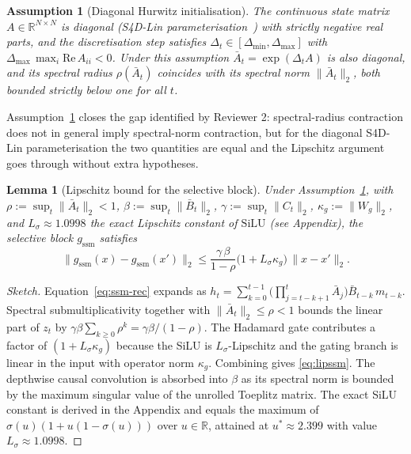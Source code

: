\documentclass{ieeeaccess}
\newcommand{\R}{\mathbb{R}}
\newtheorem{lemma}[theorem]{Lemma}
\newtheorem{assumption}[theorem]{Assumption}
\begin{document}
\begin{assumption}[Diagonal Hurwitz initialisation]
\label{ass:hurwitz}
The continuous state matrix $A\in\R^{N\times N}$ is diagonal (S4D-Lin parameterisation~\cite{Gu2022S4D}) with strictly negative real parts, and the discretisation step satisfies $\Delta_{t}\in[\Delta_{\min},\Delta_{\max}]$ with $\Delta_{\max}\,\max_{i}\mathrm{Re}\,A_{ii}<0$. Under this assumption $\bar A_{t}=\exp(\Delta_{t}A)$ is also diagonal, and its spectral radius $\rho(\bar A_{t})$ coincides with its spectral norm $\|\bar A_{t}\|_{2}$, both bounded strictly below one for all $t$.
\end{assumption}

Assumption~\ref{ass:hurwitz} closes the gap identified by Reviewer 2: spectral-radius contraction does not in general imply spectral-norm contraction, but for the diagonal S4D-Lin parameterisation the two quantities are equal and the Lipschitz argument goes through without extra hypotheses.

\begin{lemma}[Lipschitz bound for the selective block]
\label{lem:lipssm}
Under Assumption~\ref{ass:hurwitz}, with $\rho:=\sup_{t}\|\bar A_{t}\|_{2}<1$, $\beta:=\sup_{t}\|\bar B_{t}\|_{2}$, $\gamma:=\sup_{t}\|C_{t}\|_{2}$, $\kappa_{g}:=\|W_{g}\|_{2}$, and $L_{\sigma}\approx 1.0998$ the exact Lipschitz constant of $\mathrm{SiLU}$ (see Appendix), the selective block $g_{\text{ssm}}$ satisfies
\begin{equation}
\|g_{\text{ssm}}(x)-g_{\text{ssm}}(x')\|_{2} \le \frac{\gamma\,\beta}{1-\rho}\bigl(1+L_{\sigma}\kappa_{g}\bigr)\,\|x-x'\|_{2}.
\label{eq:lipssm}
\end{equation}
\end{lemma}

\begin{proof}[Sketch]
Equation~\eqref{eq:ssm-rec} expands as $h_{t}=\sum_{k=0}^{t-1}\bigl(\prod_{j=t-k+1}^{t}\bar A_{j}\bigr)\bar B_{t-k}\,m_{t-k}$. Spectral submultiplicativity together with $\|\bar A_{t}\|_{2}\le\rho<1$ bounds the linear part of $z_{t}$ by $\gamma\beta\sum_{k\ge 0}\rho^{k}=\gamma\beta/(1-\rho)$. The Hadamard gate contributes a factor of $(1+L_{\sigma}\kappa_{g})$ because the SiLU is $L_{\sigma}$-Lipschitz and the gating branch is linear in the input with operator norm $\kappa_{g}$. Combining gives \eqref{eq:lipssm}. The depthwise causal convolution is absorbed into $\beta$ as its spectral norm is bounded by the maximum singular value of the unrolled Toeplitz matrix. The exact SiLU constant is derived in the Appendix and equals the maximum of $\sigma(u)(1+u(1-\sigma(u)))$ over $u\in\R$, attained at $u^{*}\approx 2.399$ with value $L_{\sigma}\approx 1.0998$.
\end{proof}
\end{document}
